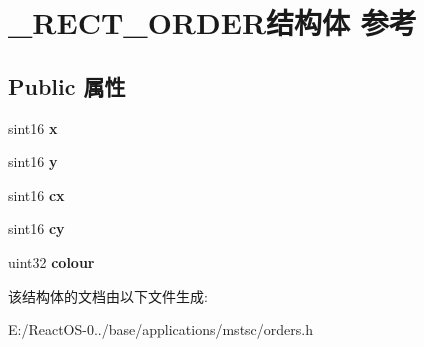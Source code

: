 \hypertarget{struct___r_e_c_t___o_r_d_e_r}{}\section{\+\_\+\+R\+E\+C\+T\+\_\+\+O\+R\+D\+E\+R结构体 参考}
\label{struct___r_e_c_t___o_r_d_e_r}
\subsection*{Public 属性}
\begin{DoxyCompactItemize}
\item 
\mbox{\label{struct___r_e_c_t___o_r_d_e_r_a62bdefb47f404135d31aecc9e87b8641}} 
sint16 {\bfseries x}
\item 
\mbox{\label{struct___r_e_c_t___o_r_d_e_r_af700531331134a41e8cd476409673bbd}} 
sint16 {\bfseries y}
\item 
\mbox{\label{struct___r_e_c_t___o_r_d_e_r_a0dc81b6b8b66d4ac78746402f047b9fd}} 
sint16 {\bfseries cx}
\item 
\mbox{\label{struct___r_e_c_t___o_r_d_e_r_ad486452c053b8121cdb6058c35e51c3e}} 
sint16 {\bfseries cy}
\item 
\mbox{\label{struct___r_e_c_t___o_r_d_e_r_ad54c3aa8e4bd7d59fc8e262e04edf8c7}} 
uint32 {\bfseries colour}
\end{DoxyCompactItemize}


该结构体的文档由以下文件生成\+:\begin{DoxyCompactItemize}
\item 
E\+:/\+React\+O\+S-\/0../base/applications/mstsc/orders.\+h\end{DoxyCompactItemize}
